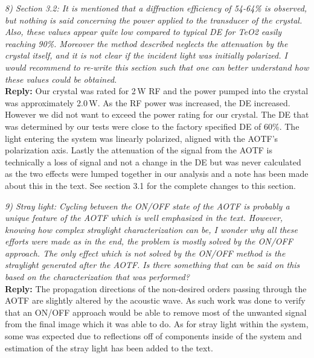 \documentclass[12pt, notitlepage]{article}
\begin{document}
\hrulefill

\textit{8) Section 3.2: It is mentioned that a diffraction efficiency of 54-64\% is observed, but
nothing is said concerning the power applied to the transducer of the crystal. Also,
these values appear quite low compared to typical DE for TeO2 easily reaching 90\%.
Moreover the method described neglects the attenuation by the crystal itself, and it is
not clear if the incident light was initially polarized. I would recommend to re-write this
section such that one can better understand how these values could be obtained.}\\

\textbf{Reply:} Our crystal was rated for 2\,W RF and the power pumped into the crystal was approximately 2.0\,W. As the RF power was increased, the DE increased. However we did not want to exceed the power rating for our crystal. The DE that was determined by our tests were close to the factory specified DE of 60\%. The light entering the system was linearly polarized, aligned with the AOTF's polarization axis. Lastly the attenuation of the signal from the AOTF is technically a loss of signal and not a change in the DE but was never calculated as the two effects were lumped together in our analysis and a note has been made about this in the text. See section 3.1 for the complete changes to this section.

\hrulefill

\textit{9) Stray light: Cycling between the ON/OFF state of the AOTF is probably a unique
feature of the AOTF which is well emphasized in the text. However, knowing how
complex straylight characterization can be, I wonder why all these efforts were made
as in the end, the problem is mostly solved by the ON/OFF approach. The only effect
which is not solved by the ON/OFF method is the straylight generated after the AOTF.
Is there something that can be said on this based on the characterization that was
performed?}\\

\textbf{Reply:} The propagation directions of the non-desired orders passing through the AOTF are slightly altered by the acoustic wave. As such work was done to verify that an ON/OFF approach would be able to remove most of the unwanted signal from the final image which it was able to do. As for stray light within the system, some was expected due to reflections off of components inside of the system and estimation of the stray light has been added to the text.

\hrulefill
\end{document}
